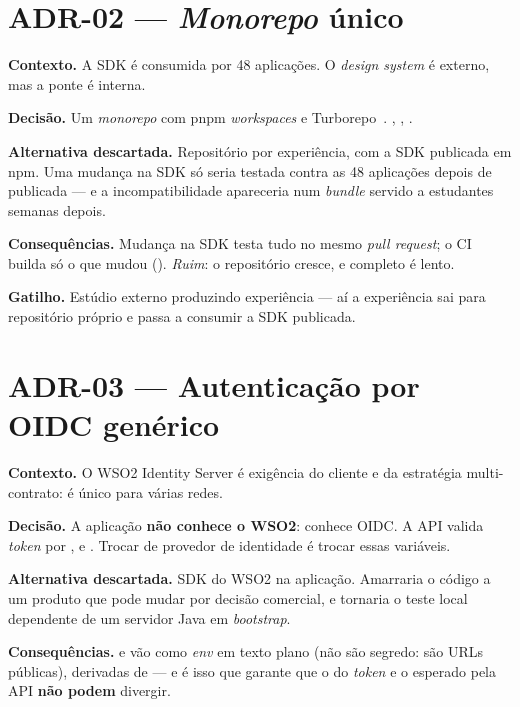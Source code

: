 \section{ADR-02 --- \emph{Monorepo} único}

\textbf{Contexto.} A SDK é consumida por 48 aplicações. O \emph{design system} é
externo, mas a ponte é interna.

\textbf{Decisão.} Um \emph{monorepo} com pnpm \emph{workspaces} e
Turborepo~\cite{turborepo2026}. , ,
.

\textbf{Alternativa descartada.} Repositório por experiência, com a SDK publicada
em npm. Uma mudança na SDK só seria testada contra as 48 aplicações depois de
publicada --- e a incompatibilidade apareceria num \emph{bundle} servido a estudantes
semanas depois.

\textbf{Consequências.} Mudança na SDK testa tudo no mesmo \emph{pull request};
o CI builda só o que mudou (). \emph{Ruim}: o
repositório cresce, e  completo é lento.

\textbf{Gatilho.} Estúdio externo produzindo experiência --- aí a experiência sai
para repositório próprio e passa a consumir a SDK publicada.

\section{ADR-03 --- Autenticação por OIDC genérico}

\textbf{Contexto.} O WSO2 Identity Server é exigência do cliente e da estratégia
multi-contrato: é único para várias redes.

\textbf{Decisão.} A aplicação \textbf{não conhece o WSO2}: conhece OIDC. A API
valida \emph{token} por ,  e
. Trocar de provedor de identidade é trocar essas
variáveis.

\textbf{Alternativa descartada.} SDK do WSO2 na aplicação. Amarraria o código a um
produto que pode mudar por decisão comercial, e tornaria o teste local dependente
de um servidor Java em \emph{bootstrap}.

\textbf{Consequências.}  e  vão como
\emph{env} em texto plano (não são segredo: são URLs públicas), derivadas de
 --- e é isso que garante que o  do \emph{token} e o
esperado pela API \textbf{não podem} divergir.

